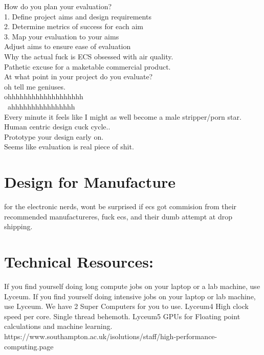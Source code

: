 \documentclass [12pt]{article}
\begin{document}
How do you plan your evaluation?\\
1. Define project aims and design requirements\\
2. Determine metrics of success for each aim\\
3. Map your evaluation to your aims\\
Adjust aims to ensure ease of evaluation\\

Why the actual fuck is ECS obsessed with air quality.\\ 
Pathetic excuse for a maketable commercial product.\\ 
At what point in your project do you
evaluate?\\
oh tell me geniuses. \\ 






ohhhhhhhhhhhhhhhhhhh\\\
ahhhhhhhhhhhhhhhh\\
Every minute it feels like I might as well become a male stripper/porn star.\\ 

Human centric design cuck cycle..\\ 

Prototype your design early on.\\ 

Seems like evaluation is real piece of shit.\\ 


\section{Design for Manufacture}


for the electronic nerds, wont be surprised if ecs got commision from their recommended manufactureres, fuck ecs, and their dumb attempt at drop shipping.\\ 



\section{Technical Resources: }



If you find yourself doing long compute jobs on your laptop or a lab machine, use Lyceum.
If you find yourself doing intensive jobs on your laptop or lab machine, use Lyceum.
We have 2 Super Computers for you to use. 
Lyceum4 High clock speed per core. Single thread behemoth.
Lyceum5 GPUs for Floating point calculations and machine learning.
https://www.southampton.ac.uk/isolutions/staff/high-performance-computing.page\\
\end{document}
